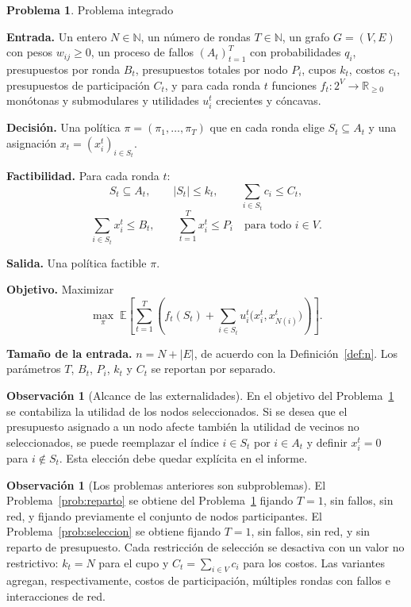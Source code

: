\documentclass[11pt,a4paper]{article}
\theoremstyle{definition}
\newtheorem{problema}[definicion]{Problema}
\newtheorem{observacion}[definicion]{Observación}
\theoremstyle{plain}
\newcommand{\N}{\mathbb{N}}
\newcommand{\R}{\mathbb{R}}
\begin{document}
\begin{problema}\label{prob:integrado} Problema integrado

\textbf{Entrada.} Un entero $N\in\N$, un número de rondas $T\in\N$, un grafo
$G=(V,E)$ con pesos $w_{ij}\ge0$, un proceso de fallos $(A_t)_{t=1}^{T}$ con
probabilidades $q_i$, presupuestos por ronda $B_t$, presupuestos totales por
nodo $P_i$, cupos $k_t$, costos $c_i$, presupuestos de participación $C_t$, y para cada
ronda $t$ funciones $f_t:2^V\to\R_{\ge0}$ monótonas y submodulares y utilidades
$u_i^t$ crecientes y cóncavas.

\textbf{Decisión.} Una política $\pi=(\pi_1,\dots,\pi_T)$ que en cada ronda
elige $S_t\subseteq A_t$ y una asignación $x_t=(x_i^t)_{i\in S_t}$.

\textbf{Factibilidad.} Para cada ronda $t$:
\[
  S_t\subseteq A_t,
  \qquad
  |S_t|\le k_t,
  \qquad
  \sum_{i\in S_t}c_i\le C_t,
\]
\[
  \sum_{i\in S_t} x_i^t\le B_t,
  \qquad
  \sum_{t=1}^{T} x_i^t\le P_i\quad\text{para todo }i\in V.
\]

\textbf{Salida.} Una política factible $\pi$.

\textbf{Objetivo.} Maximizar
\[
  \max_{\pi}\;
  \mathbb{E}\left[
    \sum_{t=1}^{T}
    \left(
      f_t(S_t)
      +
      \sum_{i\in S_t} u_i^t\bigl(x_i^t,x_{N(i)}^t\bigr)
    \right)
  \right].
\]

\textbf{Tamaño de la entrada.} $n=N+|E|$, de acuerdo con la
Definición~\ref{def:n}. Los parámetros $T$, $B_t$, $P_i$, $k_t$ y $C_t$ se
reportan por separado.
\end{problema}

\begin{observacion}[Alcance de las externalidades]
En el objetivo del Problema~\ref{prob:integrado} se contabiliza la utilidad de
los nodos seleccionados. Si se desea que el presupuesto asignado a un nodo
afecte también la utilidad de vecinos no seleccionados, se puede reemplazar el
índice $i\in S_t$ por $i\in A_t$ y definir $x_i^t=0$ para $i\notin S_t$. Esta
elección debe quedar explícita en el informe.
\end{observacion}

\begin{observacion}[Los problemas anteriores son subproblemas]
El Problema~\ref{prob:reparto} se obtiene del Problema~\ref{prob:integrado}
fijando $T=1$, sin fallos, sin red, y fijando previamente el conjunto de nodos
participantes. El Problema~\ref{prob:seleccion} se obtiene fijando $T=1$, sin
fallos, sin red, y sin reparto de presupuesto. Cada restricción de selección se
desactiva con un valor no restrictivo: $k_t=N$ para el cupo y
$C_t=\sum_{i\in V}c_i$ para los costos. Las variantes agregan,
respectivamente, costos de participación, múltiples rondas con fallos e
interacciones de red.
\end{observacion}
\end{document}
